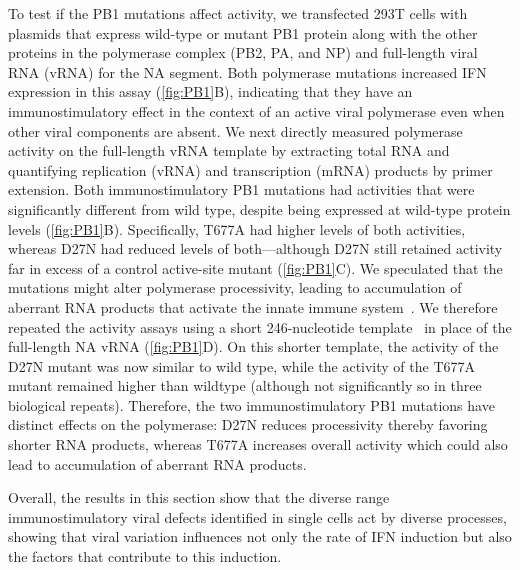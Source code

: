 \documentclass[]{asm-article}
\newcommand{\FIG}[1]{\autoref{fig:#1}}
\begin{document}
To test if the PB1 mutations affect activity, we transfected 293T cells with plasmids that express wild-type or mutant PB1 protein along with the other proteins in the polymerase complex (PB2, PA, and NP) and full-length viral RNA (vRNA) for the NA segment.
Both polymerase mutations increased IFN expression in this assay (\FIG{PB1}B), indicating that they have an immunostimulatory effect in the context of an active viral polymerase even when other viral components are absent.
We next directly measured polymerase activity on the full-length vRNA template by extracting total RNA and quantifying replication (vRNA) and transcription (mRNA) products by primer extension.
Both immunostimulatory PB1 mutations had activities that were significantly different from wild type, despite being expressed at wild-type protein levels (\FIG{PB1}B).
Specifically, T677A had higher levels of both activities, whereas D27N had reduced levels of both---although D27N still retained activity far in excess of a control active-site mutant (\FIG{PB1}C).
We speculated that the mutations might alter polymerase processivity, leading to accumulation of aberrant RNA products that activate the innate immune system~\cite{velthuis2018mini, baum2010preference, tapia2013defective, boergeling2015evidence, dimmock2015cloned, liu2019inhibition}.
We therefore repeated the activity assays using a short 246-nucleotide template~\cite{velthuis2018mini} in place of the full-length NA vRNA (\FIG{PB1}D).
On this shorter template, the activity of the D27N mutant was now similar to wild type, while the activity of the T677A mutant remained higher than wildtype (although not significantly so in three biological repeats). 
Therefore, the two immunostimulatory PB1 mutations have distinct effects on the polymerase: D27N reduces processivity thereby favoring shorter RNA products, whereas T677A increases overall activity which could also lead to accumulation of aberrant RNA products.

Overall, the results in this section show that the diverse range immunostimulatory viral defects identified in single cells act by diverse processes, showing that viral variation influences not only the rate of IFN induction but also the factors that contribute to this induction.
\end{document}
